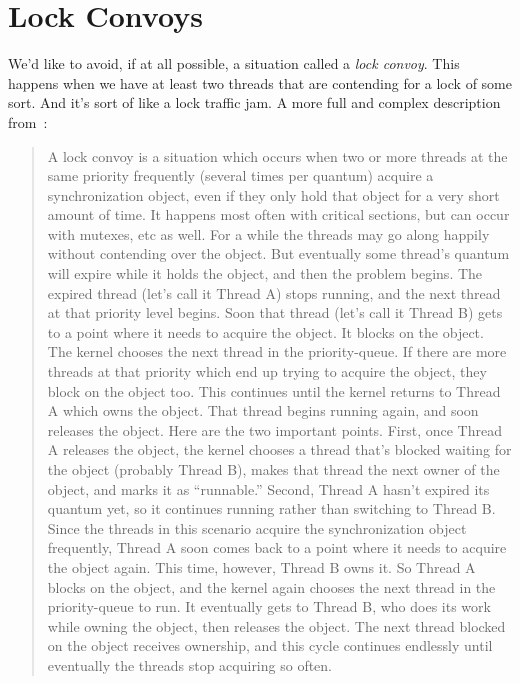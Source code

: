 




\section*{Lock Convoys}

We'd like to avoid, if at all possible, a situation called a \textit{lock convoy}. This happens when we have at least two threads that are contending for a lock of some sort. And it's sort of like a lock traffic jam. A more full and complex description from~\cite{lockconvoys}:

\begin{quote}
A lock convoy is a situation which occurs when two or more threads at the same priority frequently (several times per quantum) acquire a synchronization object, even if they only hold that object for a very short amount of time. It happens most often with critical sections, but can occur with mutexes, etc as well. For a while the threads may go along happily without contending over the object. But eventually some thread's quantum will expire while it holds the object, and then the problem begins. The expired thread (let's call it Thread A) stops running, and the next thread at that priority level begins. Soon that thread (let's call it Thread B) gets to a point where it needs to acquire the object. It blocks on the object. The kernel chooses the next thread in the priority-queue. If there are more threads at that priority which end up trying to acquire the object, they block on the object too. This continues until the kernel returns to Thread A which owns the object. That thread begins running again, and soon releases the object. Here are the two important points. First, once Thread A releases the object, the kernel chooses a thread that's blocked waiting for the object (probably Thread B), makes that thread the next owner of the object, and marks it as ``runnable.'' Second, Thread A hasn't expired its quantum yet, so it continues running rather than switching to Thread B. Since the threads in this scenario acquire the synchronization object frequently, Thread A soon comes back to a point where it needs to acquire the object again. This time, however, Thread B owns it. So Thread A blocks on the object, and the kernel again chooses the next thread in the priority-queue to run. It eventually gets to Thread B, who does its work while owning the object, then releases the object. The next thread blocked on the object receives ownership, and this cycle continues endlessly until eventually the threads stop acquiring so often.
\end{quote}

